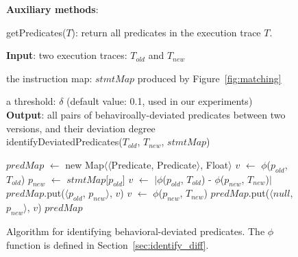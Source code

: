 \begin{figure}[t]

\textbf{Auxiliary methods}: 

\quad getPredicates($\mathit{T}$): return all predicates in the execution trace $\mathit{T}$.

\textbf{Input}: two execution traces: $\mathit{T_{old}}$ and $T_{new}$

\quad the instruction map: $\mathit{stmtMap}$ produced by Figure~\ref{fig:matching}

\quad a threshold: $\delta$ (default value: 0.1, used in our experiments)\\
\textbf{Output}: all pairs of behaviroally-deviated predicates between two versions, and their deviation degree\\
\vspace{-4mm}%
identifyDeviatedPredicates($\mathit{T_{old}}$, $\mathit{T_{new}}$, $\mathit{stmtMap}$)\\
\begin{algorithmic}[1]
\STATE $\mathit{predMap}$ $\leftarrow$ new Map$\langle$$\langle$Predicate, Predicate$\rangle$, Float$\rangle$
\STATE $\mathit{v}$ $\leftarrow$ $\phi$($\mathit{p_{old}}$, $\mathit{T_{old}}$)
\STATE $\mathit{p_{new}}$ $\leftarrow$ $\mathit{stmtMap}$[$\mathit{p_{old}}$]
\STATE $\mathit{v}$ $\leftarrow$ $|\phi$($\mathit{p_{old}}$, $\mathit{T_{old}}$) - $\phi$($\mathit{p_{new}}$, $\mathit{T_{new}}$)$|$
\ENDIF
{}
\STATE $\mathit{predMap}$.put($\langle$$\mathit{p_{old}}$, $p_{new}$$\rangle$, $\mathit{v}$)
\ENDIF
\ENDFOR
{}
\STATE $\mathit{v}$ $\leftarrow$ $\phi$($\mathit{p_{new}}$, $\mathit{T_{new}}$)
\STATE $\mathit{predMap}$.put($\langle$$\mathit{null}$, $p_{new}$$\rangle$, $\mathit{v}$)
\ENDIF
\ENDIF
\ENDFOR
\RETURN $\mathit{predMap}$
\end{algorithmic}
\vspace{-2mm}
\caption{Algorithm for identifying behavioral-deviated
predicates. The $\phi$ function is defined in Section~\ref{sec:identify_diff}.
\label{fig:identify}
}
\end{figure}
